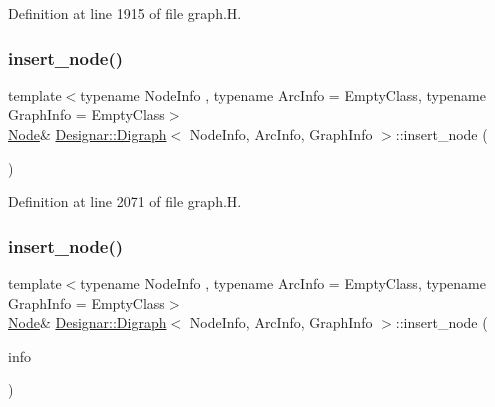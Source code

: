 Definition at line 1915 of file graph.\+H.

\mbox{\label{class_designar_1_1_digraph_a6ee69792c537ce241a2e448da1b46f1b}} 
\subsubsection{\texorpdfstring{insert\+\_\+node()}{insert\_node()}\hspace{0.1cm}{\footnotesize\ttfamily [2/4]}}
{\footnotesize\ttfamily template$<$typename Node\+Info , typename Arc\+Info  = Empty\+Class, typename Graph\+Info  = Empty\+Class$>$ \\
\hyperlink{class_designar_1_1_digraph_a4dc921c41a480b7946a04170e997d8ae}{Node}\& \hyperlink{class_designar_1_1_digraph}{Designar\+::\+Digraph}$<$ Node\+Info, Arc\+Info, Graph\+Info $>$\+::insert\+\_\+node (\begin{DoxyParamCaption}{ }\end{DoxyParamCaption})\hspace{0.3cm}{\ttfamily [inline]}}



Definition at line 2071 of file graph.\+H.

\mbox{\label{class_designar_1_1_digraph_a292dae36c1ee1fa581013c908ecebd1c}} 
\subsubsection{\texorpdfstring{insert\+\_\+node()}{insert\_node()}\hspace{0.1cm}{\footnotesize\ttfamily [3/4]}}
{\footnotesize\ttfamily template$<$typename Node\+Info , typename Arc\+Info  = Empty\+Class, typename Graph\+Info  = Empty\+Class$>$ \\
\hyperlink{class_designar_1_1_digraph_a4dc921c41a480b7946a04170e997d8ae}{Node}\& \hyperlink{class_designar_1_1_digraph}{Designar\+::\+Digraph}$<$ Node\+Info, Arc\+Info, Graph\+Info $>$\+::insert\+\_\+node (\begin{DoxyParamCaption}\item[{const Node\+Info \&}]{info }\end{DoxyParamCaption})\hspace{0.3cm}{\ttfamily [inline]}}



